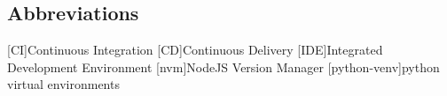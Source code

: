 \newcommand{\abbr}{Abbreviations}
\subsection{Abbreviations}

\begin{acronym}[1234567890ABC]		%
\setlength{\itemsep}{-\parsep}	%

[CI]{Continuous Integration}
[CD]{Continuous Delivery}
[IDE]{Integrated Development Environment }
[nvm]{NodeJS Version Manager}
[python-venv]{python virtual environments}

\end{acronym}